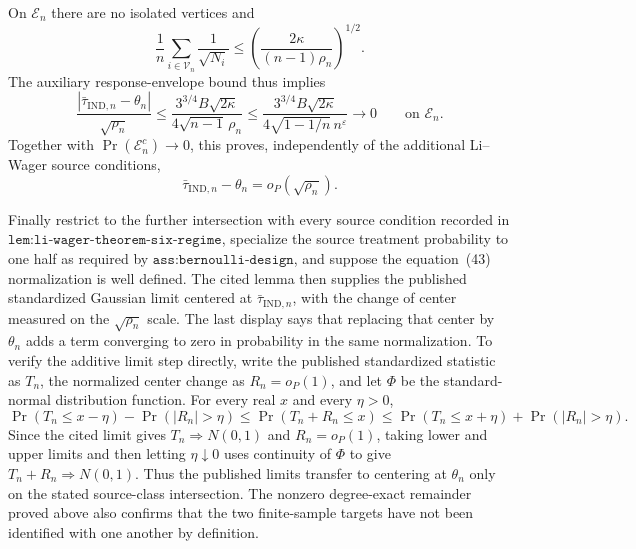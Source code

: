 On \(\mathcal E_n\) there are no isolated vertices and
\[
 \frac1n\sum_{i\in\mathcal V_n}\frac1{\sqrt{N_i}}
 \le\left(\frac{2\kappa}{(n-1)\rho_n}\right)^{1/2}.
\]
The auxiliary response-envelope bound thus implies
\[
 \frac{\left|\bar\tau_{\mathrm{IND},n}-\theta_n\right|}{\sqrt{\rho_n}}
 \le\frac{3^{3/4}B\sqrt{2\kappa}}{4\sqrt{n-1}\,\rho_n}
 \le\frac{3^{3/4}B\sqrt{2\kappa}}{4\sqrt{1-1/n}\,n^{\varepsilon}}
 \longrightarrow0
 \qquad\text{on }\mathcal E_n.
\]
Together with \(\Pr(\mathcal E_n^c)\to0\), this proves, independently of the additional Li--Wager source conditions,
\[
 \bar\tau_{\mathrm{IND},n}-\theta_n=o_P(\sqrt{\rho_n}).
\]

Finally restrict to the further intersection with every source condition recorded in \(\texttt{lem:li-wager-theorem-six-regime}\), specialize the source treatment probability to one half as required by \(\texttt{ass:bernoulli-design}\), and suppose the equation~(43) normalization is well defined. The cited lemma then supplies the published standardized Gaussian limit centered at \(\bar\tau_{\mathrm{IND},n}\), with the change of center measured on the \(\sqrt{\rho_n}\) scale. The last display says that replacing that center by \(\theta_n\) adds a term converging to zero in probability in the same normalization. To verify the additive limit step directly, write the published standardized statistic as \(T_n\), the normalized center change as \(R_n=o_P(1)\), and let \(\Phi\) be the standard-normal distribution function. For every real \(x\) and every \(\eta>0\),
\[
 \Pr(T_n\le x-\eta)-\Pr(|R_n|>\eta)
 \le \Pr(T_n+R_n\le x)
 \le \Pr(T_n\le x+\eta)+\Pr(|R_n|>\eta).
\]
Since the cited limit gives \(T_n\Rightarrow N(0,1)\) and \(R_n=o_P(1)\), taking lower and upper limits and then letting \(\eta\downarrow0\) uses continuity of \(\Phi\) to give \(T_n+R_n\Rightarrow N(0,1)\). Thus the published limits transfer to centering at \(\theta_n\) only on the stated source-class intersection. The nonzero degree-exact remainder proved above also confirms that the two finite-sample targets have not been identified with one another by definition.